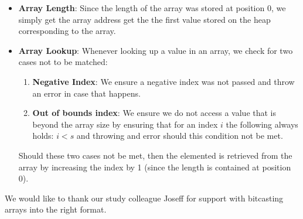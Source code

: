 \documentclass[paper=a4, fontsize=11pt]{scrartcl}
\numberwithin{equation}{section}		%
\numberwithin{figure}{section}			%
\numberwithin{table}{section}				%
\begin{document}
\begin{itemize}
\item \textbf{Array Length}: Since the length of the array was stored at position 0, we simply get the array address get the the first value stored on the heap corresponding to the array. 
\item \textbf{Array Lookup}: Whenever looking up a value in an array, we check for two cases not to be matched:
\begin{enumerate}
	\item \textbf{Negative Index}: We ensure a negative index was not passed and throw an error in case that happens. 
	\item \textbf{Out of bounds index}: We ensure we do not access a value that is beyond the array size by ensuring that for an index $i$ the following always holds: $i < s$ and throwing and error should this condition not be met.
\end{enumerate}
Should these two cases not be met, then the elemented is retrieved from the array by increasing the index by 1 (since the length is contained at position 0).

\end{itemize}


\begin{thebibliography}{9}%
We would like to thank our study colleague Joseff for support with bitcasting arrays into the right format.
\end{thebibliography}
\end{document}
